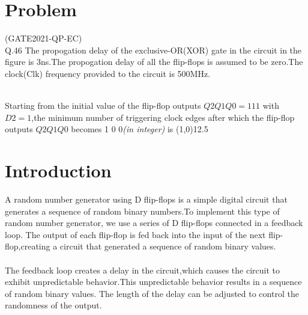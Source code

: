 \documentclass[10pt,a4paper]{article}
\title{\mytitle}
\author{MARIKUNDAM HARSHITHA\\marikundamdec@gmail.com\\FWC22120 IITH-Future Wireless Communications     Assignment-1}
\date{}
\begin{document}
\maketitle
\tableofcontents

\section{Problem}
(GATE2021-QP-EC)\\
Q.46 The propogation delay of the exclusive-OR(XOR) gate in the circuit in the figure is 3ns.The propogation delay of all the flip-flops is assumed to be zero.The clock(Clk) frequency provided to the circuit is 500MHz.\\
\\
Starting from the initial value of the flip-flop outputs $Q2Q1Q0 =111$ with $D2=1$,the minimum number of triggering clock edges after which the flip-flop outputs $Q2Q1Q0$ becomes 1 0 0\emph{(in integer)} is \line(1,0){12.5}

\section{Introduction}
A random number generator using D flip-flops is a simple digital circuit that generates a sequence of random binary numbers.To implement this type of random number generator, we use a series of D flip-flops connected in a feedback loop. The output of each flip-flop is fed back into the input of the next flip-flop,creating a circuit that generated a sequence of random binary values.\\ \\
The feedback loop creates a delay in the circuit,which causes the circuit to exhibit unpredictable behavior.This unpredictable behavior results in a sequence of random binary values. The length of the delay can be adjusted to control the randomness of the output.
\end{document}
